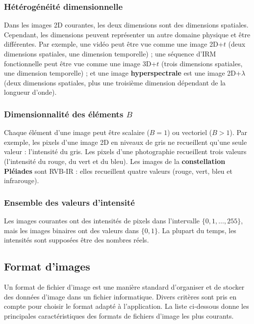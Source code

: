 \subsubsection{Hétérogénéité dimensionnelle}
Dans les images 2D courantes, les deux dimensions sont des dimensions spatiales. Cependant, les dimensions peuvent représenter un autre domaine physique et être différentes. Par exemple, une vidéo peut être vue comme une image 2D+\( t \) (deux dimensions spatiales, une dimension temporelle) ; une séquence d'IRM fonctionnelle peut être vue comme une image 3D+\( t \) (trois dimensions spatiales, une dimension temporelle) ; et une image \textbf{hyperspectrale} est une image 2D+\( \lambda \) (deux dimensions spatiales, plus une troisième dimension dépendant de la longueur d'onde).

\subsubsection{Dimensionnalité des éléments \( B \)}
Chaque élément d'une image peut être scalaire (\( B = 1 \)) ou vectoriel (\( B > 1 \)). Par exemple, les pixels d'une image 2D en niveaux de gris ne recueillent qu'une seule valeur : l'intensité du gris. Les pixels d'une photographie recueillent trois valeurs (l'intensité du rouge, du vert et du bleu). Les images de la \textbf{constellation Pléiades} sont RVB-IR : elles recueillent quatre valeurs (rouge, vert, bleu et infrarouge).

\subsubsection{Ensemble des valeurs d'intensité}
Les images courantes ont des intensités de pixels dans l'intervalle \(\{0, 1, \ldots, 255\}\), mais les images binaires ont des valeurs dans \(\{0, 1\}\). La plupart du temps, les intensités sont supposées être des nombres réels.

\subsection{Format d'images}
Un format de fichier d'image est une manière standard d'organiser et de stocker des données d'image dans un fichier informatique. Divers critères sont pris en compte pour choisir le format adapté à l'application. La liste ci-dessous donne les principales caractéristiques des formats de fichiers d'image les plus courants.

